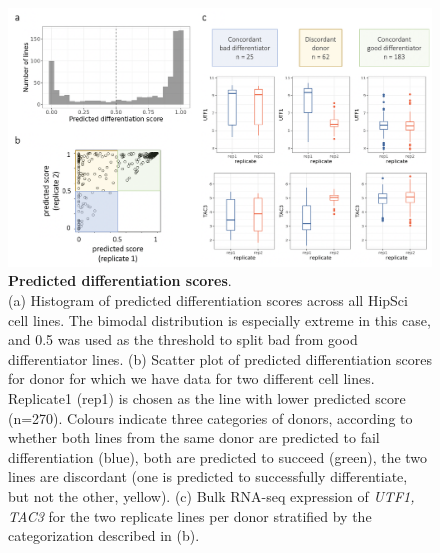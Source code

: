 \vspace{10mm}

\begin{figure}[h]
    \centering
    \includegraphics[width=15cm]{Appendix2/Fig/suppl_donor_effects.png}
    \caption[Predicted differentiation scores]{\textbf{Predicted differentiation scores}.\\
    (a) Histogram of predicted differentiation scores across all HipSci cell lines. 
    The bimodal distribution is especially extreme in this case, and 0.5 was used as the threshold to split bad from good differentiator lines. 
    (b) Scatter plot of predicted differentiation scores for donor for which we have data for two different cell lines. Replicate1 (rep1) is chosen as the line with lower predicted score (n=270). 
    Colours indicate three categories of donors, according to whether both lines from the same donor are predicted to fail differentiation (blue), both are predicted to succeed (green), the two lines are discordant (one is predicted to successfully differentiate, but not the other, yellow). (c) Bulk RNA-seq expression of \textit{UTF1, TAC3} for the two replicate lines per donor stratified by the categorization described in (b).}
    \label{suppl_fig:predicted_scores_donors}
\end{figure}

